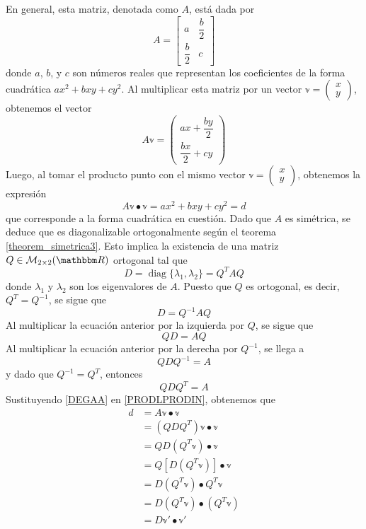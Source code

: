 En general, esta matriz, denotada como $A$, está dada por
$$A = \begin{bmatrix} a & \dfrac{b}{2} \\[1.5mm] \dfrac{b}{2} & c \end{bmatrix}$$
donde $a$, $b$, y $c$ son números reales que representan los coeficientes de la forma cuadrática $ax^2 + bxy + cy^2$. Al multiplicar esta matriz por un vector $\mathbb{v} = \begin{pmatrix} x \\ y \end{pmatrix}$, obtenemos el vector
$$A\mathbb{v} = \begin{pmatrix} ax + \dfrac{by}{2} \\[2mm] \dfrac{bx}{2} + cy \end{pmatrix}$$
Luego, al tomar el producto punto con el mismo vector $\mathbb{v} = \begin{pmatrix} x \\ y \end{pmatrix}$, obtenemos la expresión
\begin{equation}
    A\mathbb{v} \bullet \mathbb{v} = ax^2 + bxy + cy^2 = d \label{PRODLPRODIN}
\end{equation}
que corresponde a la forma cuadrática en cuestión. Dado que $A$ es simétrica, se deduce que es diagonalizable ortogonalmente según el teorema \ref{theorem_simetrica3}. Esto implica la existencia de una matriz $Q \in \mathcal{M}_{2 \times 2}(\RR)$ ortogonal tal que
$$D = \operatorname{diag} \{ \lambda_1, \lambda_2 \} = Q^T A Q$$\newpage\noindent
donde $\lambda_1$ y $\lambda_2$ son los eigenvalores de $A$. Puesto que $Q$ es ortogonal, es decir, $Q^T = Q^{-1}$, se sigue que
$$D = Q^{-1}AQ$$
Al multiplicar la ecuación anterior por la izquierda por $Q$, se sigue que
$$QD = AQ$$
Al multiplicar la ecuación anterior por la derecha por $Q^{-1}$, se llega a
$$QDQ^{-1} = A$$
y dado que $Q^{-1} = Q^T$, entonces
\begin{equation}
    QDQ^T = A \label{DEGAA}
\end{equation}
Sustituyendo \eqref{DEGAA} en \eqref{PRODLPRODIN}, obtenemos que
\begin{align*}
    d & = A\mathbb{v} \bullet \mathbb{v} \\
    & = \left( QDQ^T \right) \mathbb{v} \bullet \mathbb{v} \\
    & = QD \left( Q^T \mathbb{v} \right) \bullet \mathbb{v} \\
    & = Q \left[ D \left( Q^T \mathbb{v} \right) \right] \bullet \mathbb{v} \\
    & = D \left( Q^T \mathbb{v} \right) \bullet Q^T \mathbb{v} \\
    & = D \left( Q^T \mathbb{v} \right) \bullet \left( Q^T \mathbb{v} \right) \\
    & = D \mathbb{v}' \bullet \mathbb{v}'
\end{align*}
